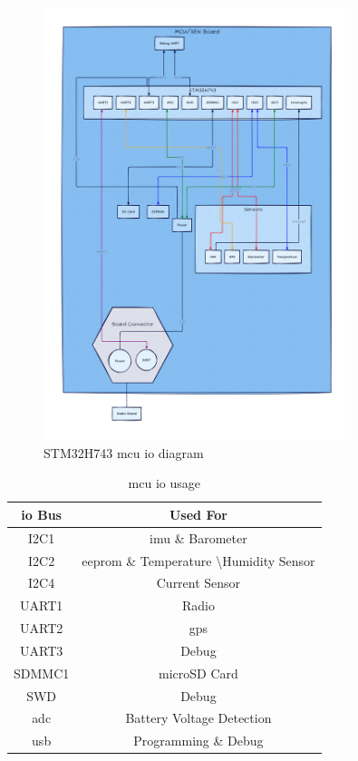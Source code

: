 \begin{figure}
    \centering
    \includegraphics[width=0.8\textwidth]{assets/diagrams/mcu_board.png}
    \caption{STM32H743 \gls{mcu} \gls{io} diagram}
    \label{fig:mcu-diagram}
\end{figure}

\begin{table}
    \caption{\gls{mcu} \gls{io} usage}
    \label{tab:mcu-io}
    \begin{tabular}{cc}
        \toprule
        \textbf{\gls{io} Bus} & \textbf{Used For} \\
        \midrule
        I2C1 & \gls{imu} \& Barometer \\
        I2C2 & \gls{eeprom} \& Temperature \textbackslash Humidity Sensor \\
        I2C4 & Current Sensor \\
        UART1 & Radio \\
        UART2 & \gls{gps} \\
        UART3 & Debug \\
        SDMMC1 & microSD Card \\
        SWD & Debug \\
        \gls{adc} & Battery Voltage Detection \\
        \gls{usb} & Programming \& Debug \\
        \bottomrule
        
    \end{tabular}
\end{table}


